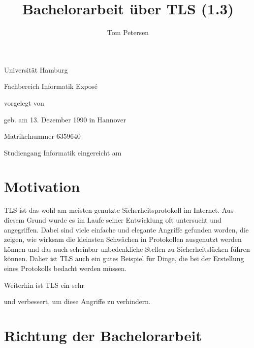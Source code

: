 \documentclass[
    12pt,
    headings=small,
    parskip=half,           %
    bibliography=totoc,
    numbers=noenddot,       %
    open=any,               %
    ]{scrreprt}
\title{Bachelorarbeit über TLS (1.3)}
\author{Tom Petersen}
\begin{document}
\begin{titlepage}
\begin{center}\Large
	Universität Hamburg \par
	Fachbereich Informatik
	\vfill
	Exposé %
	\vfill
	\makeatletter
	{\Large\textsf{\textbf{\@title}}\par}
	\makeatother
	\vfill
	vorgelegt von
	\par\bigskip
	\makeatletter
	{\@author} \par
	\makeatother
	geb. am 13. Dezember 1990 in Hannover \par
	Matrikelnummer 6359640 \par
	Studiengang Informatik
	\vfill
	\makeatletter
	eingereicht am {\@date}
	\makeatother
	\vfill
\end{center}
\end{titlepage}

\chapter{Motivation}

TLS ist das wohl am meisten genutzte Sicherheitsprotokoll im Internet. Aus diesem Grund wurde es im Laufe seiner Entwicklung oft untersucht und angegriffen. Dabei sind viele einfache und elegante Angriffe gefunden worden, die zeigen, wie wirksam die kleinsten Schwächen in Protokollen ausgenutzt werden können und das auch scheinbar unbedenkliche Stellen zu Sicherheitslücken führen können. Daher ist TLS auch ein gutes Beispiel für Dinge, die bei der Erstellung eines Protokolls bedacht werden müssen. 

Weiterhin ist TLS ein sehr 

und verbessert, um diese Angriffe zu verhindern.




\chapter{Richtung der Bachelorarbeit}
\end{document}

